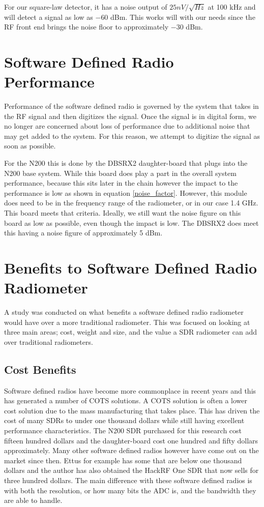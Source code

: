 For our square-law detector, it has a noise output of $25nV/ \sqrt{Hz}$ at 100 kHz and will detect a signal as low as $-60$ dBm.  This works will with our needs since the RF front end brings the noise floor to approximately $-30$ dBm.


\section{Software Defined Radio Performance}
Performance of the software defined radio is governed by the system that takes in the RF signal and then digitizes the signal.  Once the signal is in digital form, we no longer are concerned about loss of performance due to additional noise that may get added to the system.  For this reason, we attempt to digitize the signal as soon as possible.

For the N200 this is done by the DBSRX2 daughter-board that plugs into the N200 base system.  While this board does play a part in the overall system performance, because this sits later in the chain however the impact to the performance is low as shown in equation \ref{noise_factor}.  However, this module does need to be in the frequency range of the radiometer, or in our case 1.4 GHz.  This board meets that criteria.  Ideally, we still want the noise figure on this board as low as possible, even though the impact is low.  The DBSRX2 does meet this having a noise figure of approximately 5 dBm.
\section{Benefits to Software Defined Radio Radiometer}
A study was conducted on what benefits a software defined radio radiometer would have over a more traditional radiometer.  This was focused on looking at three main areas; cost, weight and size, and the value a SDR radiometer can add over traditional radiometers.

\subsection{Cost Benefits}
Software defined radios have become more commonplace in recent years and this has generated a number of COTS solutions.  A COTS solution is often a lower cost solution due to the mass manufacturing that takes place.  This has driven the cost of many SDRs to under one thousand dollars while still having excellent performance characteristics.  The N200 SDR purchased for this research cost fifteen hundred dollars and the daughter-board cost one hundred and fifty dollars approximately.  Many other software defined radios however have come out on the market since then.  Ettus for example has some that are below one thousand dollars and the author has also obtained the HackRF One SDR that now sells for three hundred dollars.  The main difference with these software defined radios is with both the resolution, or how many bits the ADC is, and the bandwidth they are able to handle.

